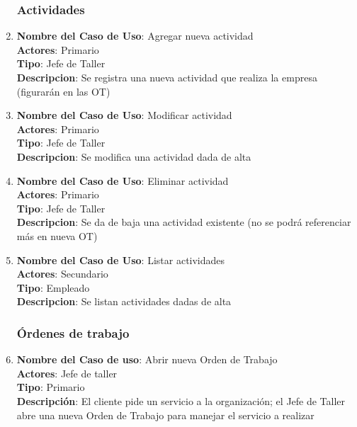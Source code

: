 \documentclass[12pt]{extarticle}
\begin{document}
\begin{spacing}{1.2}
\begin{enumerate}
            \subsubsection{Actividades}



            \item 	\textbf{Nombre del Caso de Uso}: Agregar nueva actividad\\
                    \textbf{Actores}: Primario\\
                    \textbf{Tipo}: Jefe de Taller\\
                    \textbf{Descripcion}: Se registra una nueva actividad que realiza la empresa (figurarán en las OT)

            \item 	\textbf{Nombre del Caso de Uso}: Modificar actividad\\
                    \textbf{Actores}: Primario\\
                    \textbf{Tipo}: Jefe de Taller\\
                    \textbf{Descripcion}: Se modifica una actividad dada de alta

            \item 	\textbf{Nombre del Caso de Uso}: Eliminar actividad\\
                    \textbf{Actores}: Primario\\
                    \textbf{Tipo}: Jefe de Taller\\
                    \textbf{Descripcion}: Se da de baja una actividad existente (no se podrá referenciar más en nueva OT)

            \item 	\textbf{Nombre del Caso de Uso}: Listar actividades\\
                    \textbf{Actores}: Secundario\\
                    \textbf{Tipo}: Empleado\\
                    \textbf{Descripcion}: Se listan actividades dadas de alta



            \subsubsection{Órdenes de trabajo}



            \item 	\textbf{Nombre del Caso de uso}: Abrir nueva Orden de Trabajo\\
                    \textbf{Actores}: Jefe de taller\\
                    \textbf{Tipo}: Primario\\
                    \textbf{Descripción}: El cliente pide un servicio a la organización; el Jefe de Taller abre una nueva Orden de Trabajo para manejar el servicio a realizar


\end{enumerate}
\end{spacing}
\end{document}
